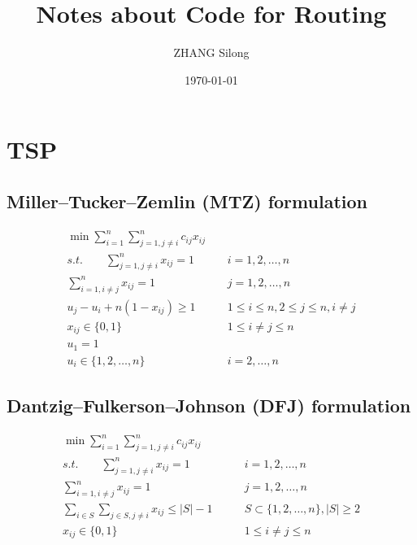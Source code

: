 \documentclass[UTF8]{article}
\title{\textbf{\Large Notes about Code for Routing}}
\author{ZHANG Silong}
\date{\today}
\begin{document}
\maketitle

\section{TSP}

	\subsection{Miller–Tucker–Zemlin (MTZ) formulation}
		\begin{align*}
			\min \sum_{i = 1}^{n} \sum_{j = 1, j \ne i}^{n} c_{ij} x_{ij} & \\
			s.t. \qquad \sum_{j = 1, j \ne i}^{n} x_{ij} = 1 \qquad & i = 1, 2, \ldots, n \\
			\sum_{i = 1, i \ne j}^{n}  x_{ij} = 1 \qquad & j = 1, 2, \ldots, n \\
			u_j - u_i + n(1 - x_{ij}) \ge 1 \qquad & 1 \le i \le n, 2 \le j \le n, i \ne j \\
			x_{ij} \in \{0, 1\} \qquad & 1 \le i \ne j \le n \\
			u_1 = 1 \qquad & \\
			u_i \in \{1, 2, \ldots, n\} \qquad & i = 2, \ldots, n 
		\end{align*}

	\subsection{Dantzig–Fulkerson–Johnson (DFJ) formulation}
		\begin{align*}
			\min \sum_{i = 1}^{n} \sum_{j = 1, j \ne i}^{n} c_{ij} x_{ij} & \\
			s.t. \qquad \sum_{j = 1, j \ne i}^{n} x_{ij} = 1 \qquad & i = 1, 2, \ldots, n \\
			\sum_{i = 1, i \ne j}^{n}  x_{ij} = 1 \qquad & j = 1, 2, \ldots, n \\
			\sum_{i \in S} \sum_{j \in S, j \ne i} x_{ij} \le |S| - 1 \qquad & S \subset \{1, 2, \ldots, n\}, |S| \ge 2 \\
			x_{ij} \in \{0, 1\} \qquad & 1 \le i \ne j \le n 
		\end{align*}
\end{document}
